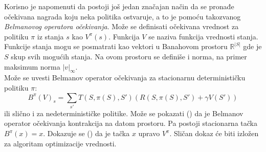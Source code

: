 \documentclass[a4paper,fleqn,12pt]{JMThesis}
\newcommand{\latin}{\fontencoding{T1}\selectfont\selectlanguage{english}}
\theoremstyle{plain}
\theoremstyle{definition}
\theoremstyle{definition}
\begin{document}
Korisno je napomenuti da postoji još jedan značajan način da se pronađe očekivana nagrada koju neka politika ostvaruje, a to je
pomoću takozvanog \textit{Belmanovog operatora očekivanja}. Može se definisati očekivana vrednost za politiku $\pi$ iz stanja $s$ kao
$V^{\pi}(s)$. Funkcija $V$ se naziva funkcija vrednosti stanja. Funkcije stanja mogu se posmatrati kao vektori u Banahovom prostoru
$\mathbb{R}^{|S|}$ gde je $S$ skup svih mogućih stanja. Na ovom prostoru se definiše i norma, na primer maksimum norma $|v|_{\infty}$.\\
Može se uvesti Belmanov operator očekivanja za stacionarnu determinističku politiku $\pi$:
\[
	B^{\pi}(V)_s = \sum_{s'}T(S,\pi(S),S')(R(S,\pi(S),S')+\gamma V(S'))
\]
ili slično i za nedeterminističke politike. Može se pokazati ({\latin \cite{puterman2014markov}}) da je Belmanov operator očekivanja kontrakcija na datom prostoru.
Pa postoji stacionarna tačka $B^{\pi}(x) = x$. Dokazuje se ({\latin \cite{puterman2014markov}}) da je tačka $x$ upravo $V^{\pi}$.
Sličan dokaz će biti izložen za algoritam optimizacije vrednosti.
\end{document}
